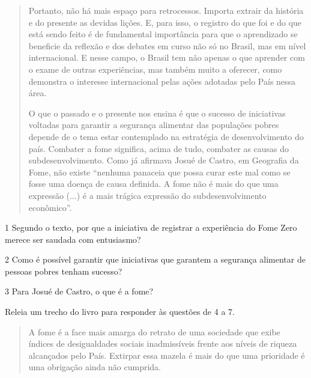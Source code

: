 \begin{quote}
Portanto, não há mais espaço para retrocessos. Importa extrair da
história e do presente as devidas lições. E, para isso, o registro do
que foi e do que está sendo feito é de fundamental importância para que
o aprendizado se beneficie da reflexão e dos debates em curso não só no
Brasil, mas em nível internacional. E nesse campo, o Brasil tem não
apenas o que aprender com o exame de outras experiências, mas também
muito a oferecer, como demonstra o interesse internacional pelas ações
adotadas pelo País nessa área.

O que o passado e o presente nos ensina é que o sucesso de iniciativas
voltadas para garantir a segurança alimentar das populações pobres
depende de o tema estar contemplado na estratégia de desenvolvimento do
país. Combater a fome significa, acima de tudo, combater as causas do
subdesenvolvimento. Como já afirmava Josué de Castro, em Geografia da
Fome, não existe ``nenhuma panaceia que possa curar este mal como se
fosse uma doença de causa definida. A fome não é mais do que uma
expressão (...) é a mais trágica expressão do subdesenvolvimento
econômico''.

\end{quote}

\num{1} Segundo o texto, por que a iniciativa de registrar a experiência
do Fome Zero merece ser saudada com entusiasmo? 


\num{2} Como é possível garantir que iniciativas que garantem a
segurança alimentar de pessoas pobres tenham sucesso? 


\num{3} Para Josué de Castro, o que é a fome? 


Releia um trecho do livro para responder às questões de 4 a 7.

\begin{quote}
A fome é a face mais amarga do retrato de uma sociedade que exibe
índices de desigualdades sociais inadmissíveis frente aos níveis de
riqueza alcançados pelo País. Extirpar essa mazela é mais do que uma
prioridade é uma obrigação ainda não cumprida.
\end{quote}

